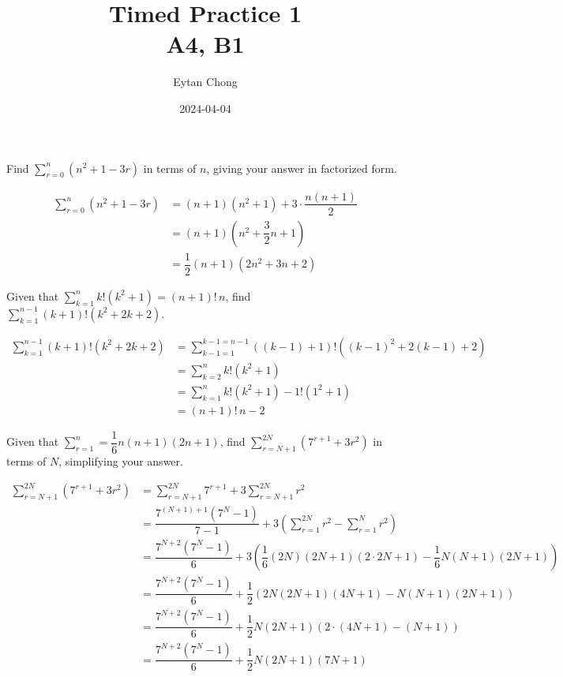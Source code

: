 \documentclass{echw}
\title{Timed Practice 1\\A4, B1}
\author{Eytan Chong}
\date{2024-04-04}
\begin{document}
    \problem{}
        Find $\displaystyle\sum\limits_{r = 0}^n \left(n^2 + 1 - 3r\right)$ in terms of $n$, giving your answer in factorized form.

    \solution
        \begin{align*}
            \sum_{r = 0}^n \left(n^2 + 1 - 3r\right) &= (n+1)(n^2 + 1) + 3 \cdot \dfrac{n(n+1)}2\\
            &= (n+1)\left(n^2 + \dfrac32 n + 1\right)\\
            &= \dfrac12 (n+1)(2n^2 + 3n + 2)
        \end{align*}


    \problem{}
        Given that $\displaystyle\sum\limits_{k=1}^n k!\left(k^2 + 1\right) = (n+1)!\,n$, find $\displaystyle\sum\limits_{k=1}^{n-1} (k+1)!\left(k^2 + 2k + 2\right)$.

    \solution
        \begin{align*}
            \sum_{k=1}^{n-1} (k+1)!\left(k^2 + 2k + 2\right) &= \sum_{k-1=1}^{k-1=n-1} \left((k-1)+1\right)!\left((k-1)^2 + 2(k-1) + 2\right)\\
            &= \sum_{k=2}^{n} k! \left(k^2 + 1\right)\\
            &= \sum_{k=1}^{n} k! \left(k^2 + 1\right) - 1! \left(1^2 + 1\right)\\
            &= (n+1)! \, n - 2
        \end{align*}


    \problem{}
        Given that $\displaystyle\sum\limits_{r=1}^n = \dfrac16 n(n+1)(2n+1)$, find $\displaystyle\sum\limits_{r=N+1}^{2N} \left(7^{r+1} + 3r^2\right)$ in terms of $N$, simplifying your answer.

    \solution
        \begin{align*}
            \sum_{r=N+1}^{2N} \left(7^{r+1} + 3r^2\right) &= \sum_{r=N+1}^{2N} 7^{r+1} + 3\sum_{r=N+1}^{2N} r^2 \\
            &= \dfrac{7^{(N+1)+1}(7^N - 1)}{7-1} + 3\left(\sum_{r=1}^{2N} r^2 - \sum_{r=1}^{N} r^2\right)\\
            &= \dfrac{7^{N+2}(7^N - 1)}{6} + 3\left(\dfrac16 (2N)(2N+1)(2 \cdot 2N + 1) - \dfrac16 N(N+1)(2N+1)\right)\\
            &= \dfrac{7^{N+2}(7^N - 1)}{6} + \dfrac12\left(2N(2N+1)(4N + 1) - N(N+1)(2N+1)\right)\\
            &= \dfrac{7^{N+2}(7^N - 1)}{6} + \dfrac12 N(2N+1)(2 \cdot (4N + 1) - (N+1))\\
            &= \dfrac{7^{N+2}(7^N - 1)}{6} + \dfrac12 N(2N+1)(7N+1)
        \end{align*}
\end{document}
